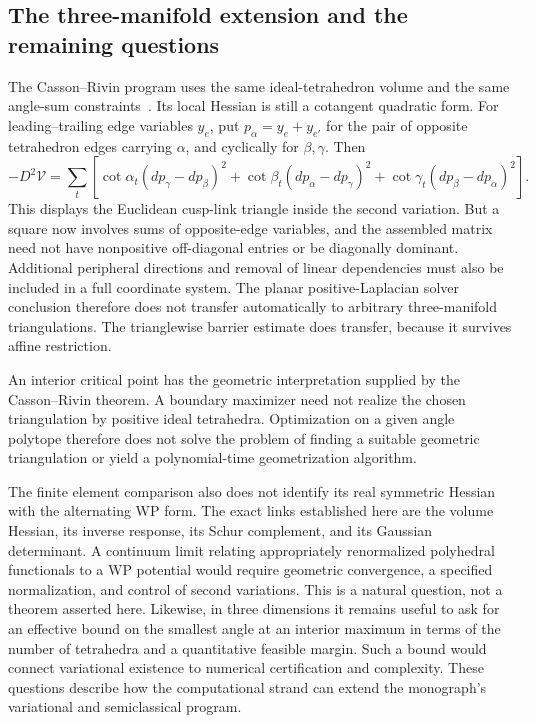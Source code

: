 \subsection{The three-manifold extension and the remaining questions}

The Casson--Rivin program uses the same ideal-tetrahedron volume and the
same angle-sum constraints~\cite{FuterGueritaud}. Its local Hessian is
still a cotangent quadratic form. For leading--trailing edge variables
$y_e$, put $p_\alpha=y_e+y_{e'}$ for the pair of opposite tetrahedron
edges carrying $\alpha$, and cyclically for $\beta,\gamma$. Then
\begin{equation}
 -D^2\mathcal V
 =\sum_t\left[
 \cot\alpha_t(dp_\gamma-dp_\beta)^2
 +\cot\beta_t(dp_\alpha-dp_\gamma)^2
 +\cot\gamma_t(dp_\beta-dp_\alpha)^2\right].
 \label{eq:ipolyThreeDimensionalHessian}
\end{equation}
This displays the Euclidean cusp-link triangle inside the second
variation. But a square now involves sums of opposite-edge variables,
and the assembled matrix need not have nonpositive off-diagonal entries
or be diagonally dominant. Additional peripheral directions and removal
of linear dependencies must also be included in a full coordinate
system. The planar positive-Laplacian solver conclusion therefore does
not transfer automatically to arbitrary three-manifold triangulations.
The trianglewise barrier estimate does transfer, because it survives
affine restriction.

An interior critical point has the geometric interpretation supplied by
the Casson--Rivin theorem. A boundary maximizer need not realize the
chosen triangulation by positive ideal tetrahedra. Optimization on a
given angle polytope therefore does not solve the problem of finding
a suitable geometric triangulation or yield a polynomial-time
geometrization algorithm.

The finite element comparison also does not identify its real symmetric
Hessian with the alternating WP form. The exact links established here
are the volume Hessian, its inverse response, its Schur complement,
and its Gaussian determinant. A continuum limit relating appropriately
renormalized polyhedral functionals to a WP potential would require
geometric convergence, a specified normalization, and control of second
variations. This is a natural question, not a theorem asserted here.
Likewise, in three dimensions it remains useful to ask for an effective
bound on the smallest angle at an interior maximum in terms of the
number of tetrahedra and a quantitative feasible margin. Such a bound
would connect variational existence to numerical certification and
complexity. These questions describe how the computational strand can
extend the monograph's variational and semiclassical program.

